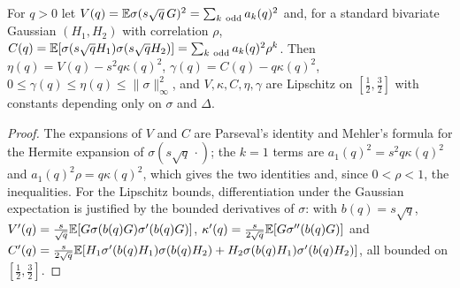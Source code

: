\begin{lemma}\label{lem:residualcov}
For $q>0$ let $V(q)=\E\sigma(s\sqrt q\,G)^2=\sum_{k\ \mathrm{odd}}a_k(q)^2$ and, for a standard bivariate
Gaussian $(H_1,H_2)$ with correlation $\rho$, $C(q)=\mathbb{E}[\sigma(s\sqrt q H_1)\sigma(s\sqrt qH_2)]=\sum_{k\ \mathrm{odd}}a_k(q)^2\rho^k$.
Then $\eta(q)=V(q)-s^2q\kappa(q)^2$, $\gamma(q)=C(q)-q\kappa(q)^2$, $0\le\gamma(q)\le\eta(q)\le\|\sigma\|_\infty^2$,
and $V,\kappa,C,\eta,\gamma$ are Lipschitz on $[\tfrac12,\tfrac32]$ with constants depending only on
$\sigma$ and $\Delta$.
\end{lemma}

\begin{proof}
The expansions of $V$ and $C$ are Parseval's identity and Mehler's formula \cite[Chapter~1]{Janson} for
the Hermite expansion of $\sigma(s\sqrt q\,\cdot)$; the $k=1$ terms are $a_1(q)^2=s^2q\kappa(q)^2$ and
$a_1(q)^2\rho=q\kappa(q)^2$, which gives the two identities and, since $0<\rho<1$, the inequalities. For the
Lipschitz bounds, differentiation under the Gaussian expectation is justified by the bounded derivatives
of $\sigma$: with $b(q)=s\sqrt q$, $V'(q)=\frac{s}{\sqrt q}\mathbb{E}[G\sigma(b(q)G)\sigma'(b(q)G)]$,
$\kappa'(q)=\frac{s}{2\sqrt q}\mathbb{E}[G\sigma''(b(q)G)]$ and
$C'(q)=\frac{s}{2\sqrt q}\mathbb{E}[H_1\sigma'(b(q)H_1)\sigma(b(q)H_2)+H_2\sigma(b(q)H_1)\sigma'(b(q)H_2)]$, all bounded
on $[\frac12,\frac32]$.
\end{proof}

